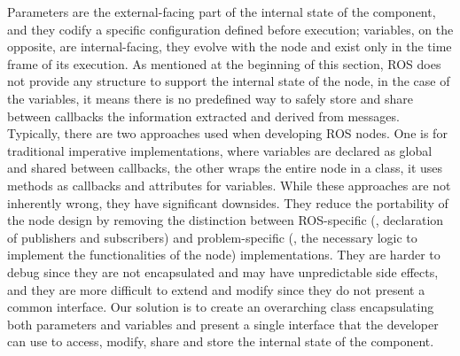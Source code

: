 Parameters are the external-facing part of the internal state of the component, and they codify a specific configuration defined before execution; variables, on the opposite, are internal-facing, they evolve with the node and exist only in the time frame of its execution. As mentioned at the beginning of this section, ROS does not provide any structure to support the internal state of the node, in the case of the variables, it means there is no predefined way to safely store and share between callbacks the information extracted and derived from messages. Typically, there are two approaches used when developing ROS nodes. One is for traditional imperative implementations, where variables are declared as global and shared between callbacks, the other wraps the entire node in a class, it uses methods as callbacks and attributes for variables. While these approaches are not inherently wrong, they have significant downsides. They reduce the portability of the node design by removing the distinction between ROS-specific (\eg, declaration of publishers and subscribers) and problem-specific (\ie, the necessary logic to implement the functionalities of the node) implementations. They are harder to debug since they are not encapsulated and may have unpredictable side effects, and they are more difficult to extend and modify since they do not present a common interface. Our solution is to create an overarching class encapsulating both parameters and variables and present a single interface that the developer can use to access, modify, share and store the internal state of the component.

